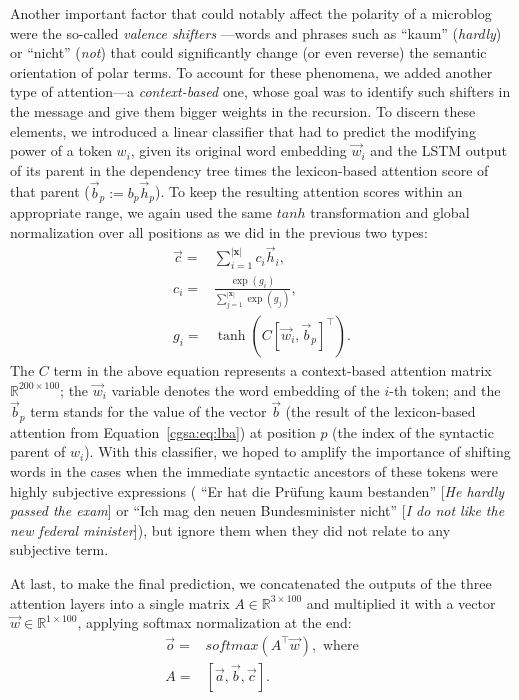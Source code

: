 Another important factor that could notably affect the polarity of a
microblog were the so-called \emph{valence shifters}
\cite[][]{Polanyi:06}---words and phrases such as ``kaum''
(\emph{hardly}) or ``nicht'' (\emph{not}) that could significantly
change (or even reverse) the semantic orientation of polar terms.  To
account for these phenomena, we added another type of attention---a
\emph{context-based} one, whose goal was to identify such shifters in
the message and give them bigger weights in the recursion.  To discern
these elements, we introduced a linear classifier that had to predict
the modifying power of a token $w_i$, given its original word
embedding $\vec{w}_i$ and the LSTM output of its parent in the
dependency tree times the lexicon-based attention score of that parent
($\vec{b}_p := b_p\vec{h}_p$).  To keep the resulting attention scores
within an appropriate range, we again used the same $tanh$
transformation and global normalization over all positions as we did
in the previous two types:
\begin{align*}
  \vec{c} =& \sum_{i=1}^{|\mathbf{x}|}c_i\vec{h}_i,\\ c_i =&
  \frac{\exp(g_i)}{\sum_{j=1}^{|\mathbf{x}|}\exp(g_j)},\\ g_i =&
  \tanh\left(C [\vec{w}_i, \vec{b}_p]^\top\right).
\end{align*}
The $C$ term in the above equation represents a context-based
attention matrix $\mathbb{R}^{200 \times 100}$; the $\vec{w}_i$
variable denotes the word embedding of the $i$-th token; and the
$\vec{b}_p$ term stands for the value of the vector $\vec{b}$ (the
result of the lexicon-based attention from Equation~\ref{cgsa:eq:lba})
at position $p$ (the index of the syntactic parent of $w_i$).  With
this classifier, we hoped to amplify the importance of shifting words
in the cases when the immediate syntactic ancestors of these tokens
were highly subjective expressions (\eg{} ``Er hat die Pr\"ufung kaum
bestanden'' [\emph{He hardly passed the exam}] or ``Ich mag den neuen
Bundesminister nicht'' [\emph{I do not like the new federal
    minister}]), but ignore them when they did not relate to any
subjective term.

At last, to make the final prediction, we concatenated the outputs of
the three attention layers into a single matrix $A\in\mathbb{R}^{3
  \times 100}$ and multiplied it with a vector
$\vec{w}\in\mathbb{R}^{1\times 100}$, applying softmax normalization
at the end:
\begin{align*}
  \vec{o} =& softmax\left(A^\top\vec{w}\right),\textrm{ where}\\
  A =& [\vec{a}, \vec{b}, \vec{c}].
\end{align*}


